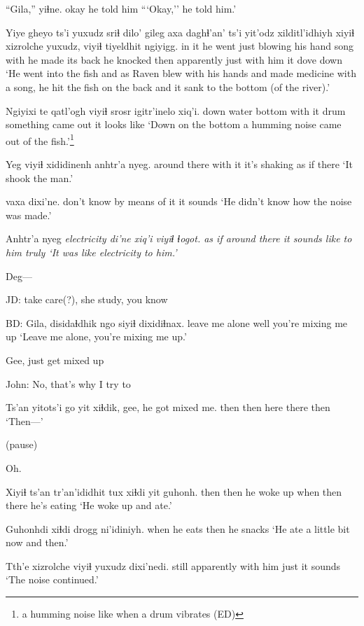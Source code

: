 \documentclass[12pt]{article}
\begin{document}
\gll ``Gila,'' yiɬne.
okay {he told him}
\glt ```Okay,'' he told him.'
\glend

\gll Yiye gheyo ts'i yuxudz sriɬ dilo' gileg axa daghɬ'an' ts'i yit'odz xilditl'idhiyh xiyiɬ xizrolche yuxudz, viyiɬ tiyeldhit ngiyigg.
{in it} {he went} {} just blowing {his hand} song with {he made} {} {its back} {he knocked} then apparently just {with him} {it dove} down
\glt `He went into the fish and as Raven blew with his hands and made medicine with a song, he hit the fish on the back and it sank to the bottom (of the river).'
\glend

\gll Ngiyixi te qatl'ogh viyiɬ srosr igitr'inelo xiq'i.
down water bottom {with it} drum {something came out} {it looks like}
\glt `Down on the bottom a humming noise came out of the fish.'\footnote{a humming noise like when a drum vibrates (ED)}
\glend

\gll Yeg viyiɬ xididinenh anhtr'a nyeg.
{around there} {with it} {it's shaking} {as if} there
\glt `It shook the man.'
\glend

 vaxa dixi'ne.
{don't know} {by means of it} {it sounds} 
\glt `He didn't know how the noise was made.'
\glend

\gll  Anhtr'a nyeg \em{electricity} di'ne xiq'i viyiɬ ɬogot.
{as if} {around there}  {it sounds} like {to him} truly
\glt `It was like electricity to him.'
\glend

Deg---

JD: take care(?), she study, you know

BD:
\gll Gila, disidaɬdhik ngo {siyiɬ dixidiɬnax}.
{} {leave me alone} well {you're mixing me up}
\glt  `Leave me alone, you're mixing me up.'
\glend

Gee, just get mixed up

John:  No, that's why I try to

\gll Ts'an yitots'i go yit xiɬdik, gee, he got mixed me.
then then here there then
\glt  `Then---'
\glend

(pause)

Oh.

\gll Xiyiɬ ts'an tr'an'ididhit tux xiɬdi yit guhonh.
then then {he woke up} when then there {he's eating}
\glt `He woke up and ate.'
\glend

\gll Guhonhdi xiɬdi {drogg ni'idiniyh.}
{when he eats} then {he snacks}
\glt `He ate a little bit now and then.'
\glend

\gll Tth'e xizrolche viyiɬ yuxudz dixi'nedi.
still apparently {with him} just {it sounds}
\glt `The noise continued.'
\glend
\end{document}
